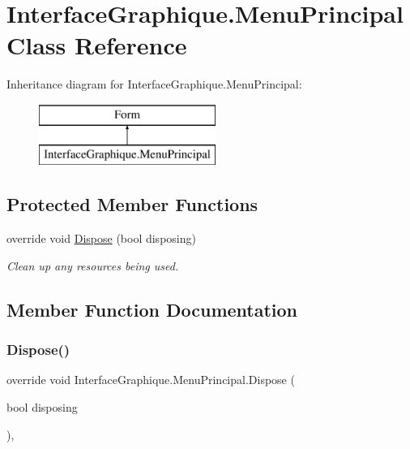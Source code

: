 \hypertarget{class_interface_graphique_1_1_menu_principal}{}\section{Interface\+Graphique.\+Menu\+Principal Class Reference}
\label{class_interface_graphique_1_1_menu_principal}
Inheritance diagram for Interface\+Graphique.\+Menu\+Principal\+:\begin{figure}[H]
\begin{center}
\leavevmode
\includegraphics[height=2.000000cm]{class_interface_graphique_1_1_menu_principal}
\end{center}
\end{figure}
\subsection*{Protected Member Functions}
\begin{DoxyCompactItemize}
\item 
override void \hyperlink{class_interface_graphique_1_1_menu_principal_a5a9389c7864e1b29b7520f77606d357d}{Dispose} (bool disposing)
\begin{DoxyCompactList}\small\item\em Clean up any resources being used. \end{DoxyCompactList}\end{DoxyCompactItemize}


\subsection{Member Function Documentation}
\hypertarget{class_interface_graphique_1_1_menu_principal_a5a9389c7864e1b29b7520f77606d357d}{}\label{class_interface_graphique_1_1_menu_principal_a5a9389c7864e1b29b7520f77606d357d} 
\subsubsection{\texorpdfstring{Dispose()}{Dispose()}}
{\footnotesize\ttfamily override void Interface\+Graphique.\+Menu\+Principal.\+Dispose (\begin{DoxyParamCaption}\item[{bool}]{disposing }\end{DoxyParamCaption})\hspace{0.3cm}{\ttfamily [inline]}, {\ttfamily [protected]}}



